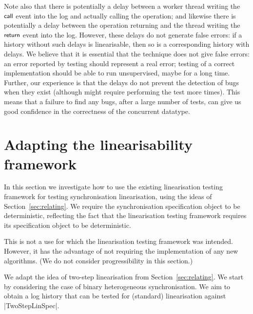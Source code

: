 Note also that there is potentially a delay between a worker thread writing the
$\mbox{\sf{\small call}}$ event into the log and actually calling the operation; and likewise
there is potentially a delay between the operation returning and the thread
writing the $\mbox{\sf{\small return}}$ event into the log.  However, these delays do not
generate false errors: if a history without such delays is linearisable, then
so is a corresponding history with delays.  We believe that it is essential
that the technique does not give false errors: an error reported by testing
should represent a real error; testing of a correct implementation should be
able to run unsupervised, maybe for a long time.  Further, our experience is
that the delays do not prevent the detection of bugs when they exist (although
might require performing the test more times).  This means that a failure to
find any bugs, after a large number of tests, can give us good confidence in
the correctness of the concurrent datatype.


\section{Adapting the linearisability framework}
\label{sec:testing-hacking}

In this section we investigate how to use the existing linearisation testing
framework for testing synchronisation linearisation, using the ideas of
Section~\ref{sec:relating}.  We require the synchronisation specification
object to be deterministic, reflecting the fact that the linearisation
testing framework requires its specification object to be deterministic.  

This is not a use for which the linearisation testing framework was intended.
However, it has the advantage of not requiring the implementation of any new
algorithms.  (We do not consider progressibility in this section.)


We adapt the idea of two-step linearisation from Section~\ref{sec:relating}.
We start by considering the case of binary heterogeneous synchronisation.  We
aim to obtain a log history that can be tested for (standard) linearisation
against |TwoStepLinSpec|.

